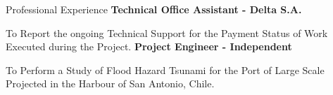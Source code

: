 \begin{rubric}{Professional Experience}
\entry*[2015]%
	\textbf{Technical Office Assistant - Delta S.A.} 
	\par To Report the ongoing Technical Support for the Payment Status of Work Executed during the Project.
%
%
\entry*[2013 - 2014]%
	\textbf{Project Engineer - Independent} 
	\par To Perform a Study of Flood Hazard Tsunami for the Port of Large Scale Projected in the Harbour of San Antonio, Chile.
\end{rubric}

    
